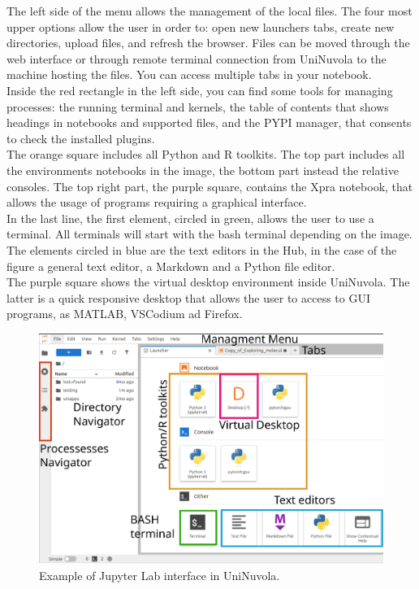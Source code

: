 The left side of the menu allows the management of the local files. The four most upper options allow the user in order
to: open new launchers tabs, create new directories, upload files, and refresh the browser. Files can be moved through
the web interface or through remote terminal connection from UniNuvola to the machine hosting the files. You can access multiple tabs in your notebook.\\ 

Inside the red rectangle in the left side, you can find some tools for managing processes: the running terminal and kernels, the table of contents that shows headings in notebooks and supported files, and the PYPI manager, that consents to check the installed plugins. \\ 

The orange square includes all Python and R toolkits. The top part includes all the environments notebooks in the image,
the bottom part instead the relative consoles. The top right part, the purple square, contains the Xpra notebook, that
allows the usage of programs requiring a graphical interface.  \\

In the last line, the first element, circled in green, allows the user to use a terminal. All terminals will start with
the bash terminal depending on the image. The elements circled in blue are the text editors in the Hub,  in the case
of the figure a general text editor, a Markdown and a Python file editor. \\

The purple square shows the virtual desktop environment inside UniNuvola. The latter is a quick responsive desktop that allows the user to access to GUI programs, as MATLAB, VSCodium ad Firefox. \\

\begin{figure}[!ht]
    \centering
    \includegraphics[width=0.8\linewidth]{img/uninuvola.pdf}
    \caption{Example of Jupyter Lab interface in UniNuvola.}
    \label{fig:uninuvola_main_page}
\end{figure}

